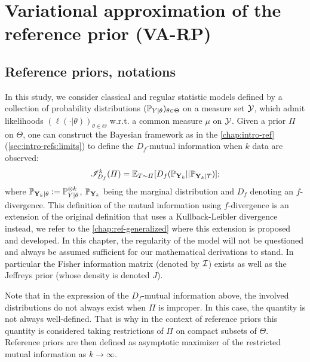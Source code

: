 \section{Variational approximation of the reference prior (VA-RP)}\label{sec:VARP:VARP}

\subsection{Reference priors, notations}\label{sec:VARP:refpriors}


In this study, we consider classical and regular statistic models defined by a collection of probability distributions $(\mathbb{P}_{Y|\theta})_{\theta\in\Theta}$ on a measure set $\mathcal{Y}$, which admit likelihoods $(\ell(\cdot|\theta))_{\theta\in\Theta}$ w.r.t. a common measure $\mu$ on $\mathcal{Y}$.
Given a prior $\varPi$ on $\Theta$, one can construct the Bayesian framework as in the \cref{chap:intro-ref} (\cref{sec:intro-refs:limits}) to define the $D_f$-mutual information when $k$ data are observed:
    \begin{equation}\label{eq:VARP:IMalltheta}
        \mathscr{I}_{D_f}^k(\varPi) = \mathbb{E}_{T\sim\varPi}[D_f(\mathbb{P}_{\mathbf{Y}_k}||\mathbb{P}_{\mathbf{Y}_k|T} ) ];
    \end{equation}
where $\mathbb{P}_{\mathbf{Y}_k|\theta}:= \mathbb{P}_{Y|\theta}^{\otimes k} $, $\mathbb{P}_{\mathbf{Y}_k}$ being the marginal distribution and $D_f$ denoting an $f$-divergence.
This definition of the mutual information using $f$-divergence is an extension of the original definition that uses a Kullback-Leibler divergence instead, we refer to the \cref{chap:ref-generalized} where this extension is proposed and developed.
In this chapter, the regularity of the model will not be questioned and always be assumed sufficient for our mathematical derivations to stand. In particular the Fisher information matrix (denoted by $\mathcal{I}$) exists as well as the Jeffreys prior (whose density is denoted $J$).


Note that in the expression of the $D_f$-mutual information above, the involved distributions 
do not always exist when $\varPi$ is improper. In this case, the quantity is not always well-defined. That is why in the context of reference priors this quantity is considered taking restrictions of $\varPi$ on compact subsets of $\Theta$. 
Reference priors are then defined as asymptotic maximizer of the restricted mutual information as $k\to\infty$.



